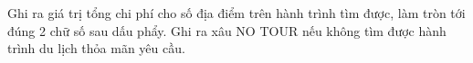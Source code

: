 Ghi ra giá trị tổng chi phí cho số địa điểm trên hành trình tìm được, làm tròn tới đúng 2 chữ số sau dấu phẩy. Ghi ra xâu NO TOUR nếu không tìm được hành trình du lịch thỏa mãn yêu cầu.  

\